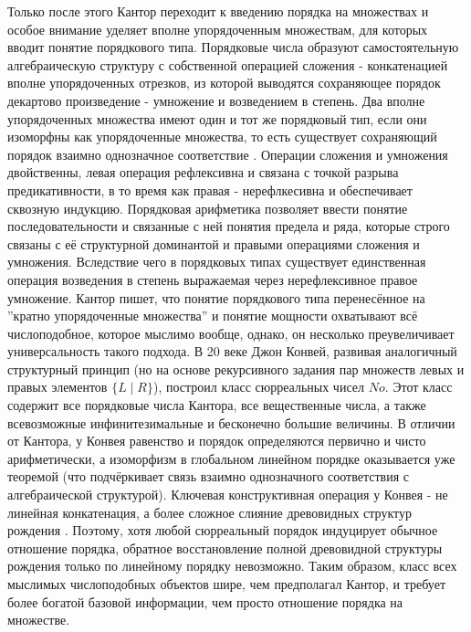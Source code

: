 \documentclass[12pt]{article}
\begin{document}
Только после этого Кантор переходит к введению порядка на множествах и особое внимание уделяет вполне упорядоченным множествам, для которых вводит понятие порядкового типа. Порядковые числа образуют самостоятельную алгебраическую структуру с собственной операцией сложения - конкатенацией вполне упорядоченных отрезков, из которой выводятся сохраняющее порядок декартово произведение - умножение и возведением в степень. Два вполне упорядоченных множества имеют один и тот же порядковый тип, если они изоморфны как упорядоченные множества, то есть существует сохраняющий порядок взаимно однозначное соответствие \cite{cantor-ordinal-algebra}. Операции сложения и умножения двойственны, левая операция рефлексивна и связана с точкой разрыва предикативности, в то время как правая - нерефлкесивна и обеспечивает сквозную индукцию. Порядковая арифметика позволяет ввести понятие последовательности и связанные с ней понятия предела и ряда, которые строго связаны с её структурной доминантой и правыми операциями сложения и умножения. Вследствие чего в порядковых типах существует единственная операция возведения в степень выражаемая через нерефлексивное правое умножение. Кантор пишет, что понятие порядкового типа перенесённое на ''кратно упорядоченные множества'' и понятие мощности охватывают всё числоподобное, которое мыслимо вообще, однако, он несколько преувеличивает универсальность такого подхода. В 20 веке Джон Конвей, развивая аналогичный структурный принцип (но на основе рекурсивного задания пар множеств левых и правых элементов $\{L \mid R\}$), построил класс сюрреальных чисел $No$. Этот класс содержит все порядковые числа Кантора, все вещественные числа, а также всевозможные инфинитезимальные и бесконечно большие величины. В отличии от Кантора, у Конвея равенство и порядок определяются первично и чисто арифметически, а изоморфизм в глобальном линейном порядке оказывается уже теоремой (что подчёркивает связь взаимно однозначного соответствия с алгебраической структурой). Ключевая конструктивная операция у Конвея - не линейная конкатенация, а более сложное слияние древовидных структур рождения \cite{conway-surreal-numbers}. Поэтому, хотя любой сюрреальный порядок индуцирует обычное отношение порядка, обратное восстановление полной древовидной структуры рождения только по линейному порядку невозможно. Таким образом, класс всех мыслимых числоподобных объектов шире, чем предполагал Кантор, и требует более богатой базовой информации, чем просто отношение порядка на множестве.
\end{document}
